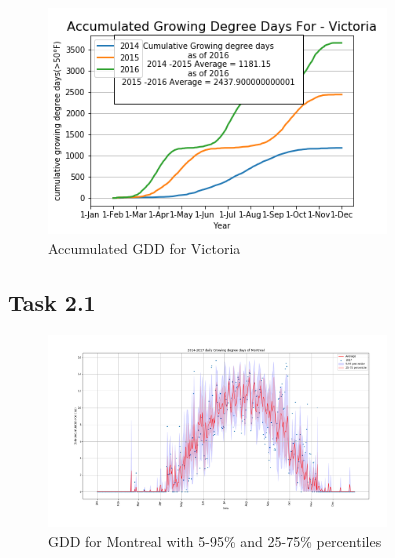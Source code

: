\documentclass[12pt]{article}
\begin{document}
\begin{figure}[!htbp]
\centering
\includegraphics[width=0.8\textwidth]{./docs/VictoriaGDD.png} 
\caption{\scriptsize Accumulated GDD for Victoria}
\label{accuGDD_3}		  
\end{figure}	

\pagebreak 	

\subsection{Task 2.1}
\begin{figure}[!htbp]
\centering
\includegraphics[width=0.8\textwidth]{./docs/task1.png} 
\caption{\scriptsize GDD for Montreal with 5-95\% and 25-75\% percentiles}
\label{GDDwCI}		  
\end{figure}

\pagebreak
\end{document}
